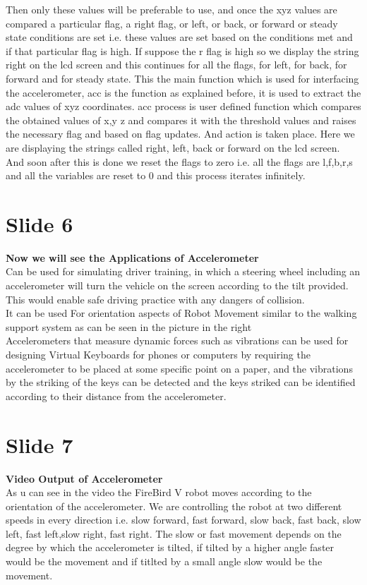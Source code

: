 \documentclass[a4paper,12 pt]{article}
\begin{document}
Then only these values will be preferable to use, and once the xyz values are compared a particular flag, a right flag, or left, or back, or forward or steady state conditions are set i.e. these values are set based on the conditions met and if that particular flag is high. If suppose the r flag is high so we display the string right on the lcd screen and this continues for all the flags, for left, for back, for forward and for steady state. This the main function which is used for interfacing the accelerometer, acc is the function as explained before, it is used to extract the adc values of xyz coordinates. acc process is user defined function which compares the obtained values of x,y z and compares it with the threshold values and raises the necessary flag and based on flag updates. And action is taken place. Here we are displaying the strings called right, left, back or forward on the lcd screen. And soon after this is done we reset the flags to zero i.e. all the flags are l,f,b,r,s and all the variables are reset to 0 and this process iterates infinitely.

\section{Slide 6} 
\textbf{Now we will see the Applications of Accelerometer}\\
Can be used for simulating driver training, in which a steering wheel including an accelerometer will turn the vehicle on the screen according to the tilt provided. This would enable safe driving practice with any dangers of collision.\\
It can be used For orientation aspects of Robot Movement similar to the walking support system as can be seen in the picture in the right\\
Accelerometers that measure dynamic forces such as vibrations can be used for designing Virtual Keyboards for phones or computers by requiring the accelerometer to be placed at some specific point on a paper, and the vibrations by the striking of the keys can be detected and the keys striked can be identified according to their distance from the accelerometer.

\section{Slide 7} 
\textbf{Video Output of Accelerometer}\\
As u can see in the video the FireBird V robot moves according  to the orientation of the accelerometer. We are controlling the robot at two different speeds in every direction i.e. slow forward, fast forward, slow back, fast back,  slow left, fast left,slow right, fast right.
The slow or fast movement depends on the degree by which the accelerometer is tilted, if tilted by a higher angle faster would be the movement and if titlted by a small angle slow would be the movement.
\end{document}
